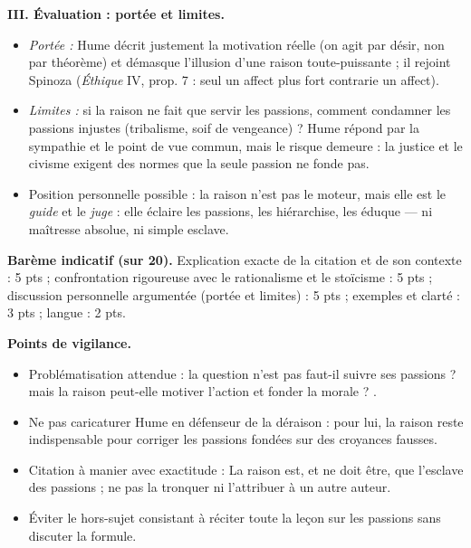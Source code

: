 \documentclass[11pt]{article}
\begin{document}
\begin{corrige}
\textbf{III. Évaluation : portée et limites.}
\begin{itemize}
\item \emph{Portée :} Hume décrit justement la motivation réelle (on agit par désir, non par théorème) et démasque l'illusion d'une raison toute-puissante ; il rejoint Spinoza (\emph{Éthique} IV, prop. 7 : seul un affect plus fort contrarie un affect).
\item \emph{Limites :} si la raison ne fait que servir les passions, comment condamner les passions injustes (tribalisme, soif de vengeance) ? Hume répond par la sympathie et le point de vue commun, mais le risque demeure : la justice et le civisme exigent des normes que la seule passion ne fonde pas.
\item Position personnelle possible : la raison n'est pas le moteur, mais elle est le \emph{guide} et le \emph{juge} : elle éclaire les passions, les hiérarchise, les éduque — ni maîtresse absolue, ni simple esclave.
\end{itemize}

\textbf{Barème indicatif (sur 20).} Explication exacte de la citation et de son contexte : 5 pts ; confrontation rigoureuse avec le rationalisme et le stoïcisme : 5 pts ; discussion personnelle argumentée (portée et limites) : 5 pts ; exemples et clarté : 3 pts ; langue : 2 pts.

\textbf{Points de vigilance.}
\begin{itemize}
\item Problématisation attendue : la question n'est pas \guillemotleft faut-il suivre ses passions ? \guillemotright{} mais \guillemotleft la raison peut-elle motiver l'action et fonder la morale ? \guillemotright.
\item Ne pas caricaturer Hume en défenseur de la déraison : pour lui, la raison reste indispensable pour corriger les passions fondées sur des croyances fausses.
\item Citation à manier avec exactitude : \guillemotleft La raison est, et ne doit être, que l'esclave des passions \guillemotright{} ; ne pas la tronquer ni l'attribuer à un autre auteur.
\item Éviter le hors-sujet consistant à réciter toute la leçon sur les passions sans discuter la formule.
\end{itemize}

\end{corrige}
\end{document}
